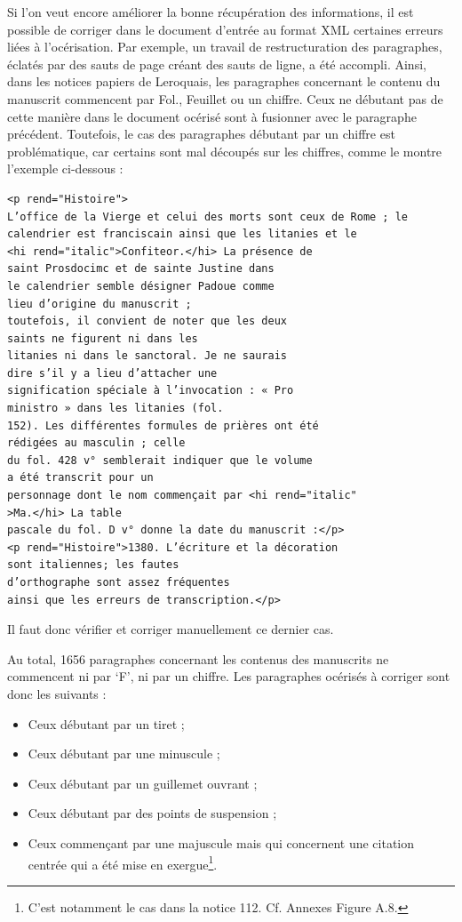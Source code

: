\documentclass[a4paper,12pt,twoside]{book}
\begin{document}
	Si l'on veut encore améliorer la bonne récupération des informations, il est possible de corriger dans le document d'entrée au format XML certaines erreurs liées à l'océrisation. Par exemple, un travail de restructuration des paragraphes, éclatés par des sauts de page créant des sauts de ligne, a été accompli. Ainsi, dans les notices papiers de Leroquais, les paragraphes concernant le contenu du manuscrit commencent par \og Fol.\fg{}, \og Feuillet\fg{} ou un chiffre. Ceux ne débutant pas de cette manière dans le document océrisé sont à fusionner avec le paragraphe précédent. Toutefois, le cas des paragraphes débutant par un chiffre est problématique, car certains sont mal découpés sur les chiffres, comme le montre l'exemple ci-dessous : 
	\begin{verbatim}
<p rend="Histoire">
L’office de la Vierge et celui des morts sont ceux de Rome ; le
calendrier est franciscain ainsi que les litanies et le 
<hi rend="italic">Confiteor.</hi> La présence de 
saint Prosdocimc et de sainte Justine dans
le calendrier semble désigner Padoue comme 
lieu d’origine du manuscrit ;
toutefois, il convient de noter que les deux 
saints ne figurent ni dans les
litanies ni dans le sanctoral. Je ne saurais 
dire s’il y a lieu d’attacher une
signification spéciale à l’invocation : « Pro 
ministro » dans les litanies (fol.
152). Les différentes formules de prières ont été 
rédigées au masculin ; celle
du fol. 428 v° semblerait indiquer que le volume 
a été transcrit pour un
personnage dont le nom commençait par <hi rend="italic"
>Ma.</hi> La table
pascale du fol. D v° donne la date du manuscrit :</p>
<p rend="Histoire">1380. L’écriture et la décoration 
sont italiennes; les fautes
d’orthographe sont assez fréquentes
ainsi que les erreurs de transcription.</p>
	\end{verbatim}
	Il faut donc vérifier et corriger manuellement ce dernier cas. 
	
	Au total, 1656 paragraphes concernant les contenus des manuscrits ne commencent ni par ‘F’, ni par un chiffre. Les paragraphes océrisés à corriger sont donc les suivants :
	\begin{itemize}
	    \item Ceux débutant par un tiret ;
	    \item Ceux débutant par une minuscule ;
	    \item Ceux débutant par un guillemet ouvrant ;
	    \item Ceux débutant par des points de suspension ;
	    \item Ceux commençant par une majuscule mais qui concernent une citation centrée qui a été mise en exergue\footnote{C'est notamment le cas dans la notice 112. Cf. Annexes Figure A.8.}.
	\end{itemize}
	
\end{document}
